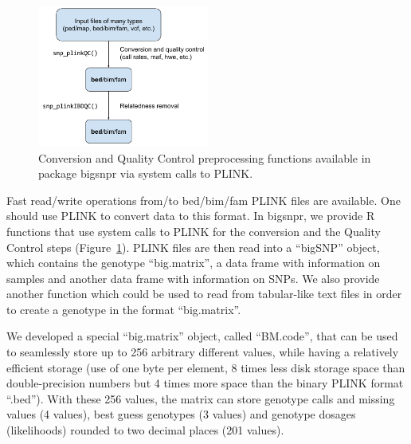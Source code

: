 \documentclass{bioinfo}
\begin{document}
\begin{figure}[!tpb]
\centerline{\includegraphics[width=160pt]{conversion+QC.pdf}}
\caption{Conversion and Quality Control preprocessing functions available in package bigsnpr via system calls to PLINK.}\label{fig:qc}
\end{figure}

Fast read/write operations from/to bed/bim/fam PLINK files are available. One should use PLINK to convert data to this format. In bigsnpr, we provide R functions that use system calls to PLINK for the conversion and the Quality Control steps (Figure~\ref{fig:qc}). PLINK files are then read into a ``bigSNP'' object, which contains the genotype ``big.matrix'', a data frame with information on samples and another data frame with information on SNPs. We also provide another function which could be used to read from tabular-like text files in order to create a genotype in the format ``big.matrix''.

We developed a special ``big.matrix'' object, called ``BM.code'', that can be used to seamlessly store up to 256 arbitrary different values, while having a relatively efficient storage (use of one byte per element, 8 times less disk storage space than double-precision numbers but 4 times more space than the binary PLINK format ``.bed''). With these 256 values, the matrix can store genotype calls and missing values (4 values), best guess genotypes (3 values) and genotype dosages (likelihoods) rounded to two decimal places (201 values).
\end{document}
